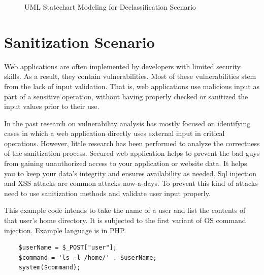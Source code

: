 \begin{figure}[htbp]
	\centering
	\label{declassification_scenario}
	\caption{UML Statechart Modeling for Declassification Scenario}
\end{figure}


\section{Sanitization Scenario}
Web applications are often implemented by developers with limited security skills. As a result, they
contain vulnerabilities. Most of these vulnerabilities stem
from the lack of input validation. That is, web applications
use malicious input as part of a sensitive operation, without having properly checked or sanitized the input values
prior to their use.

In the past research on vulnerability analysis has mostly focused on identifying cases in which a web application directly uses external input in critical operations. However,
little research has been performed to analyze the correctness of the sanitization process. Secured web application helps to prevent the bad guys from gaining unauthorized access to your application or website data. It helps you to keep your data's integrity and ensures availability as needed. Sql injection and XSS attacks are common attacks now-a-days. To prevent this kind of attacks need to use sanitization methods and validate user input properly.

This example code intends to take the name of a user and list the contents of that user's home directory. It is subjected to the first variant of OS command injection. Example language is in PHP.

\begin{lstlisting}
	$userName = $_POST["user"];
	$command = 'ls -l /home/' . $userName;
	system($command);
\end{lstlisting} 

